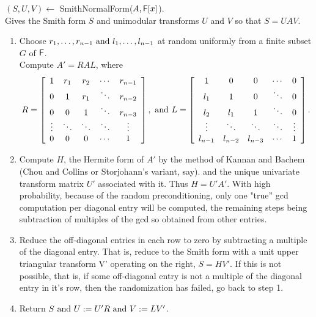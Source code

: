 \begin{center}
$(S, U, V) \leftarrow $ SmithNormalForm($A, {\mathsf F}[x]$).\\
\bc Gives the Smith form $S$ and unimodular transforms $U$ and $V$ so that $S = UAV$. \ec
\end{center}
\begin{enumerate}
\item
Choose $r_1, \ldots, r_{n-1} ~\mbox{and}~ l_1, \ldots, l_{n-1}$ at random uniformly
from a finite subset $G$ of ${\mathsf F}$.\\
Compute  $ A' = RAL$, where
\[ R = 
\left[ \begin{array}{ccccc}
1      & r_1    & r_2    & \cdots & r_{n-1}\\
0      & 1      & r_1    & \ddots & r_{n-2}\\
0      & 0      & 1      & \ddots & r_{n-3}\\
\vdots & \ddots & \ddots & \ddots & \vdots \\
0      & 0      & 0      & \cdots & 1      \\
\end{array}\right],
~\mbox{and}~
L = 
\left[ \begin{array}{ccccc}
1       & 0       & 0       & \cdots & 0      \\
l_1     & 1       & 0       & \ddots & 0      \\
l_2     & l_1     & 1       & \ddots & 0      \\
\vdots  & \ddots  & \ddots  & \ddots & \vdots \\
l_{n-1} & l_{n-2} & l_{n-3} & \cdots & 1      \\
\end{array}\right]. \]
\item
Compute $H$, the Hermite form of $A'$ by the method of Kannan and Bachem 
(Chou and Collins or Storjohann's variant, say).
and the unique univariate transform matrix $U'$ associated with it.  Thus $H = U'A'$. 
With high probability, because of the random preconditioning, only one "true'' gcd computation
per diagonal entry will be computed, the remaining steps being subtraction of multiples of the 
gcd so obtained from other entries.
\item
Reduce the off-diagonal entries in each row to zero by subtracting a multiple of the diagonal
entry.  That is, reduce to the Smith form with a unit upper triangular transform V' 
operating on the right, $S = HV'$.  If this is not possible, that is, if some 
off-diagonal entry is not a multiple of the
diagonal entry in it's row, then the randomization has failed, go back to step 1.
\item
Return $S ~\mbox{and}~ U := U'R ~\mbox{and}~ V := LV'$.
\end{enumerate}

